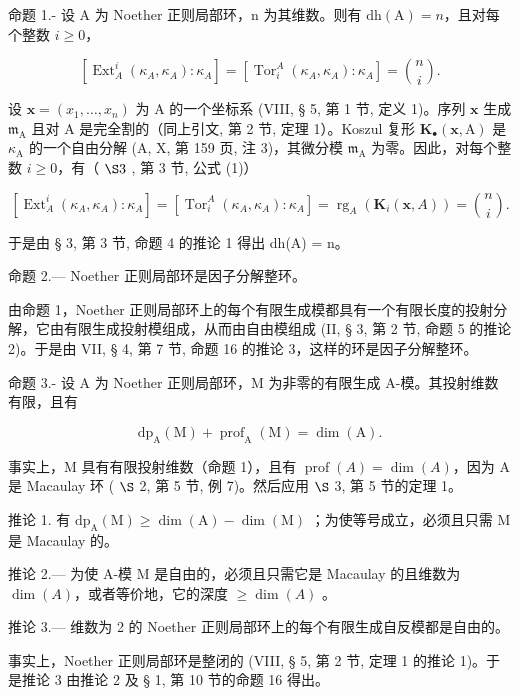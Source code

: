 命题 1.- 设 A 为 Noether 正则局部环，n 为其维数。则有 \(\mathrm{dh(A)} = n\)，且对每个整数 \(i \geqslant 0\)，

\[
\left[ \operatorname{Ext} _ {A} ^ {i} \left(\kappa_ {A}, \kappa_ {A}\right): \kappa_ {A} \right] = \left[ \operatorname{Tor} _ {i} ^ {A} \left(\kappa_ {A}, \kappa_ {A}\right): \kappa_ {A} \right] = \binom {n} {i}.
\]

设 \(\mathbf{x} = (x_{1},\ldots ,x_{n})\) 为 A 的一个坐标系 (VIII, § 5, 第 1 节, 定义 1)。序列 \(\mathbf{x}\) 生成 \(\mathfrak{m}_{\mathrm{A}}\) 且对 A 是完全割的（同上引文, 第 2 节, 定理 1）。Koszul 复形 \(\mathbf{K}_{\bullet}(\mathbf{x},\mathrm{A})\) 是 \(\kappa_{\mathrm{A}}\) 的一个自由分解 (A, X, 第 159 页, 注 3)，其微分模 \(\mathfrak{m}_{\mathrm{A}}\) 为零。因此，对每个整数 \(i\geqslant 0\)，有（ \(\S 3\) , 第 3 节, 公式 (1)）

\[
\left[ \operatorname{Ext} _ {A} ^ {i} (\kappa_ {A}, \kappa_ {A}): \kappa_ {A} \right] = \left[ \operatorname{Tor} _ {i} ^ {A} (\kappa_ {A}, \kappa_ {A}): \kappa_ {A} \right] = \operatorname{rg} _ {A} (\mathbf {K} _ {i} (\mathbf {x}, A)) = \binom {n} {i}.
\]

于是由 § 3, 第 3 节, 命题 4 的推论 1 得出 dh(A) = n。

命题 2.--- Noether 正则局部环是因子分解整环。

由命题 1，Noether 正则局部环上的每个有限生成模都具有一个有限长度的投射分解，它由有限生成投射模组成，从而由自由模组成 (II, § 3, 第 2 节, 命题 5 的推论 2)。于是由 VII, § 4, 第 7 节, 命题 16 的推论 3，这样的环是因子分解整环。

命题 3.- 设 A 为 Noether 正则局部环，M 为非零的有限生成 A-模。其投射维数有限，且有

\[
\mathrm{dp} _ {\mathrm{A}} (\mathrm{M}) + \operatorname{prof} _ {\mathrm{A}} (\mathrm{M}) = \dim (\mathrm{A}).
\]

事实上，M 具有有限投射维数（命题 1），且有 \(\operatorname{prof}(A) = \dim(A)\)，因为 A 是 Macaulay 环 ( \(\S\) 2, 第 5 节, 例 7)。然后应用 \(\S\) 3, 第 5 节的定理 1。

推论 1. 有 \(\mathrm{dp}_{\mathrm{A}}(\mathrm{M}) \geqslant \dim(\mathrm{A}) - \dim(\mathrm{M})\) ；为使等号成立，必须且只需 M 是 Macaulay 的。

推论 2.--- 为使 A-模 M 是自由的，必须且只需它是 Macaulay 的且维数为 \(\dim(A)\)，或者等价地，它的深度 \(\geqslant \dim(A)\) 。

推论 3.--- 维数为 2 的 Noether 正则局部环上的每个有限生成自反模都是自由的。

事实上，Noether 正则局部环是整闭的 (VIII, § 5, 第 2 节, 定理 1 的推论 1)。于是推论 3 由推论 2 及 § 1, 第 10 节的命题 16 得出。

